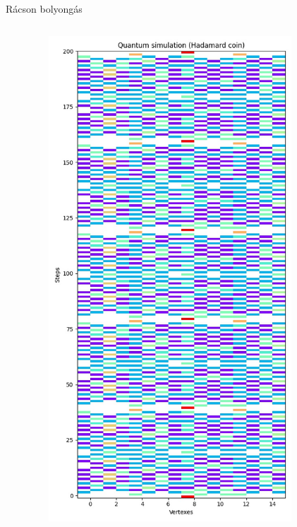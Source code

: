\documentclass[aspectratio=169]{beamer}
\begin{document}
\begin{frame}{Rácson bolyongás}
\begin{columns}[onlytextwidth]
    \begin{column}{.08\textwidth}
    \end{column}
    \begin{column}{.23\textwidth}
      \begin{figure}
        \includegraphics[width=0.9\textwidth]{./tdk_figures/results/grid/hadamard.jpg}
      \end{figure}
    \end{column}
     \begin{column}{.23\textwidth}

\end{column}
\end{columns}
\end{frame}
\end{document}
